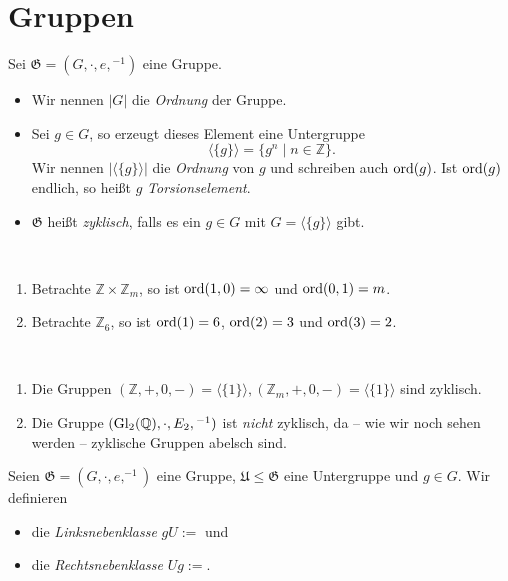 \section{Gruppen}

\begin{definition}
    Sei $\mathfrak{G} = (G, \cdot, e, {}^{-1})$ eine Gruppe.
    \begin{itemize}
        \item Wir nennen $|G|$ die \emph{Ordnung} der Gruppe.
        \item Sei $g \in G$, so erzeugt dieses Element eine Untergruppe
        $$ \langle \{ g \} \rangle = \{ g^n \mid n \in \mathbb{Z} \}. $$
        Wir nennen $|\langle\{g\}\rangle|$ die \emph{Ordnung} von $g$ und schreiben auch $\operatorname{ord}(g)$. Ist $\operatorname{ord}(g)$ endlich, so heißt $g$ \emph{Torsionselement}.
        \item $\mathfrak{G}$ heißt \emph{zyklisch}, falls es ein $g \in G$ mit $G = \langle\{g\}\rangle$ gibt.
    \end{itemize}
\end{definition}

\begin{example} {\ }
    \begin{enumerate}
        \item Betrachte $\mathbb{Z} \times \mathbb{Z}_m$, so ist $\operatorname{ord}(1,0) = \infty$ und $\operatorname{ord}(0,1) = m$.
        \item Betrachte $\mathbb{Z}_6$, so ist $\operatorname{ord}(1) = 6$, $\operatorname{ord}(2) = 3$ und $\operatorname{ord}(3) = 2$.
    \end{enumerate}
\end{example}

\begin{example} {\ }
    \begin{enumerate}
        \item Die Gruppen $(\mathbb{Z}, +, 0, -) = \langle\{1\}\rangle, (\mathbb{Z}_m, +, 0, -) = \langle\{1\}\rangle$ sind zyklisch.
        \item Die Gruppe $(\operatorname{Gl}_2(\mathbb{Q}), \cdot, E_2, {}^{-1})$ ist \emph{nicht} zyklisch, da -- wie wir noch sehen werden -- zyklische Gruppen abelsch sind.
    \end{enumerate}
\end{example}

\begin{definition}
    Seien $\mathfrak{G} = (G, \cdot, e, ^{-1})$ eine Gruppe, $\mathfrak{U} \le \mathfrak{G}$ eine Untergruppe und $g \in G$. Wir definieren 
    \begin{itemize}[topsep=0cm, label={--}]
        \item die \emph{Linksnebenklasse} $gU := {}$ und
        \item die \emph{Rechtsnebenklasse} $Ug := {}$. %
    \end{itemize}
\end{definition}

